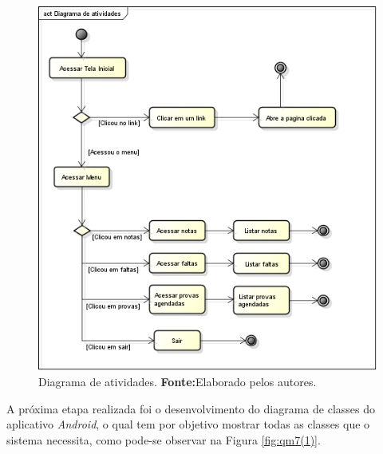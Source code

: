 		
		\begin{figure}[h!]
			\centerline{\includegraphics[scale=0.4]{./imagens/2_q_metodologico/qm3.png}}
			\caption[Diagrama de atividades]{Diagrama de atividades.
			 \textbf{Fonte:}Elaborado pelos autores.}
			\label{fig:qm3}
		\end{figure}
		
		\par A próxima etapa realizada foi o desenvolvimento do diagrama de classes do
aplicativo \textit{Android}, o qual tem por objetivo mostrar todas as classes
que o sistema necessita, como pode-se observar na Figura \ref{fig:qm7(1)}.
		
